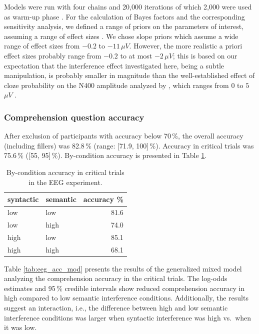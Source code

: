 \documentclass[a4paper, man, floatsintext]{apa7}
\begin{document}
Models were run with four chains and 20,000 iterations of which 2,000 were used as warm-up phase \citep{schad_etal_2022_BF}. For the calculation of Bayes factors and the corresponding sensitivity analysis, we defined a range of priors on the parameters of interest, assuming a range of effect sizes \citep{nicenboim_stats}. We chose slope priors which assume a wide range of effect sizes from $-0.2$ to $-11$\,$\mu V$. However, the more realistic a priori effect sizes probably range from $-0.2$ to at most $-2$\,$\mu V$; this is based on our expectation that the interference effect investigated here, being a subtle manipulation, is probably smaller in magnitude than the well-established  effect of cloze probability on the N400 amplitude analyzed by \cite{nicenboim_stats}, which ranges from $0$ to $5$\,$\mu V$ \parencite[see section 5.2.5][]{nicenboim_stats}.

\subsubsection{Comprehension question accuracy}
After exclusion of participants with accuracy below 70\,\%, the overall accuracy (including fillers) was 82.8\,\% (range: [71.9, 100]\,\%). Accuracy in critical trials was 75.6\,\% ([55, 95]\,\%). By-condition accuracy is presented in Table \ref{tab:eeg_acc}. 

\begin{table}[]
    \caption{By-condition accuracy in critical trials in the EEG experiment.}
    \label{tab:eeg_acc}
    \centering
    \begin{tabular}{llr}
    \toprule
    syntactic & semantic & accuracy \%\\
    \midrule
        low &  low & 81.6\\
        low &  high & 74.0\\
        high &  low & 85.1\\
        high &  high & 68.1\\
    \bottomrule
    \end{tabular}
\end{table}

Table \ref{tab:eeg_acc_mod} presents the results of the generalized mixed model analyzing the comprehension accuracy in the critical trials. The log-odds estimates and 95\,\% credible intervals show reduced comprehension accuracy in high compared to low semantic interference conditions. Additionally, the results suggest an interaction, i.e., the difference between high and low semantic interference conditions was larger when syntactic interference was high vs.\ when it was low.
\end{document}
